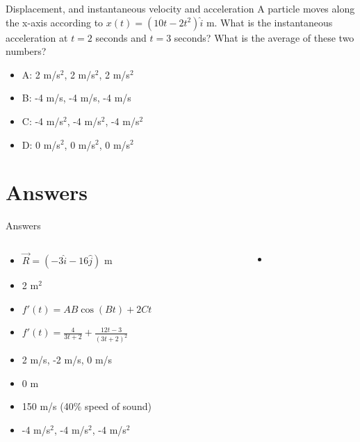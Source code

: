 \documentclass{beamer}
\begin{document}
\begin{frame}{Displacement, and instantaneous velocity and acceleration}
A particle moves along the x-axis according to $x(t) = (10t-2t^2)\hat{i}$ m.  What is the instantaneous acceleration
at $t=2$ seconds and $t=3$ seconds? What is the average of these two numbers?
\begin{itemize}
\item A: 2 m/s$^2$, 2 m/s$^2$, 2 m/s$^2$
\item B: -4 m/s, -4 m/s, -4 m/s
\item C: -4 m/s$^2$, -4 m/s$^2$, -4 m/s$^2$
\item D: 0 m/s$^2$, 0 m/s$^2$, 0 m/s$^2$
\end{itemize}
\end{frame}

\section{Answers}

\begin{frame}{Answers}
\begin{columns}[T]
\begin{column}{0.5\textwidth}
\begin{itemize}
\item $\vec{R} =  (-3\hat{i}-16\hat{j})$ m
\item 2 m$^2$
\item $f'(t) = AB\cos(Bt) + 2Ct$
\item $f'(t) = \frac{4}{3t+2}+\frac{12t-3}{(3t+2)^2}$
\item 2 m/s, -2 m/s, 0 m/s
\item 0 m
\item 150 m/s (40\% speed of sound)
\item -4 m/s$^2$, -4 m/s$^2$, -4 m/s$^2$
\end{itemize}
\end{column}
\begin{column}{0.5\textwidth}
\begin{itemize}
\item 
\end{itemize}
\end{column}
\end{columns}
\end{frame}
\end{document}
